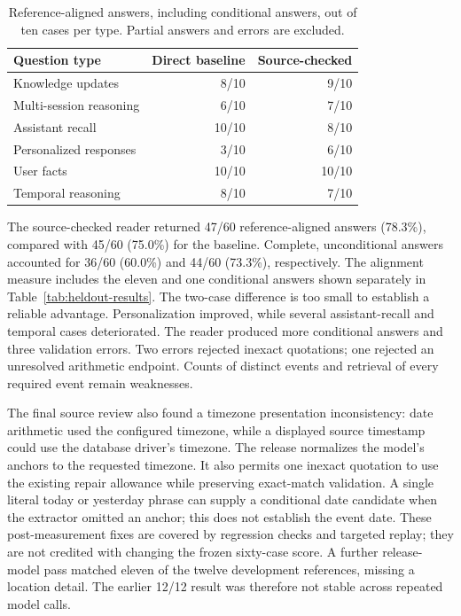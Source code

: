 \begin{table}[htbp]
\centering
\begin{tabular}{lrr}
\toprule
Question type & Direct baseline & Source-checked\\
\midrule
Knowledge updates & 8/10 & 9/10 \\
Multi-session reasoning & 6/10 & 7/10 \\
Assistant recall & 10/10 & 8/10 \\
Personalized responses & 3/10 & 6/10 \\
User facts & 10/10 & 10/10 \\
Temporal reasoning & 8/10 & 7/10 \\
\bottomrule
\end{tabular}
\caption{Reference-aligned answers, including conditional answers, out of ten
cases per type. Partial answers and errors are excluded.}
\end{table}

The source-checked reader returned 47/60 reference-aligned answers (78.3\%),
compared with 45/60 (75.0\%) for the baseline. Complete, unconditional answers
accounted for 36/60 (60.0\%) and 44/60 (73.3\%), respectively. The alignment
measure includes the eleven and one conditional answers shown separately in
Table~\ref{tab:heldout-results}. The two-case difference is too small to establish a
reliable advantage. Personalization improved, while several assistant-recall
and temporal cases deteriorated. The reader produced more conditional answers
and three validation errors. Two errors rejected inexact quotations; one
rejected an unresolved arithmetic endpoint. Counts of distinct events and
retrieval of every required event remain weaknesses.

The final source review also found a timezone presentation inconsistency: date
arithmetic used the configured timezone, while a displayed source timestamp
could use the database driver's timezone. The release normalizes the model's
anchors to the requested timezone. It also permits one inexact quotation to use
the existing repair allowance while preserving exact-match validation. A single
literal today or yesterday phrase can supply a conditional date candidate when
the extractor omitted an anchor; this does not establish the event date. These
post-measurement fixes are covered by regression checks and targeted replay;
they are not credited with changing the frozen sixty-case score. A further
release-model pass matched eleven of the twelve development references,
missing a location detail. The earlier 12/12 result was therefore not stable
across repeated model calls.

